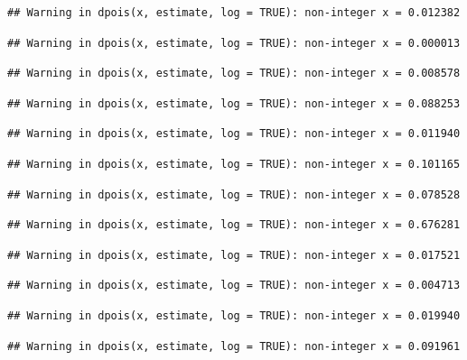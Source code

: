\documentclass[]{article}
\begin{document}
\begin{verbatim}
## Warning in dpois(x, estimate, log = TRUE): non-integer x = 0.012382
\end{verbatim}

\begin{verbatim}
## Warning in dpois(x, estimate, log = TRUE): non-integer x = 0.000013
\end{verbatim}

\begin{verbatim}
## Warning in dpois(x, estimate, log = TRUE): non-integer x = 0.008578
\end{verbatim}

\begin{verbatim}
## Warning in dpois(x, estimate, log = TRUE): non-integer x = 0.088253
\end{verbatim}

\begin{verbatim}
## Warning in dpois(x, estimate, log = TRUE): non-integer x = 0.011940
\end{verbatim}

\begin{verbatim}
## Warning in dpois(x, estimate, log = TRUE): non-integer x = 0.101165
\end{verbatim}

\begin{verbatim}
## Warning in dpois(x, estimate, log = TRUE): non-integer x = 0.078528
\end{verbatim}

\begin{verbatim}
## Warning in dpois(x, estimate, log = TRUE): non-integer x = 0.676281
\end{verbatim}

\begin{verbatim}
## Warning in dpois(x, estimate, log = TRUE): non-integer x = 0.017521
\end{verbatim}

\begin{verbatim}
## Warning in dpois(x, estimate, log = TRUE): non-integer x = 0.004713
\end{verbatim}

\begin{verbatim}
## Warning in dpois(x, estimate, log = TRUE): non-integer x = 0.019940
\end{verbatim}

\begin{verbatim}
## Warning in dpois(x, estimate, log = TRUE): non-integer x = 0.091961
\end{verbatim}
\end{document}
